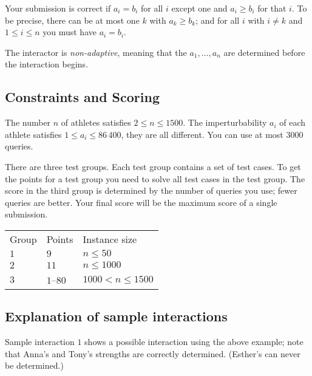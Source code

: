Your submission is correct if $a_i=b_i$ for all $i$ except one and $a_i \ge b_i$ for that $i$.
To be precise, there can be at most one $k$ with $a_k\geq b_k$;
and for all $i$ with $i\neq k$ and $1\leq i\leq n$ you must have $a_i=b_i$.

The interactor is \emph{non-adaptive}, meaning that the $a_1,\ldots, a_n$ are determined before the interaction begins.

\subsection*{Constraints and Scoring}

The number $n$ of athletes satisfies 
$2\leq n\leq 1500$. %
The imperturbability $a_i$ of each athlete satisfies 
$1\leq a_i\leq 86\,400$, %
they are all different. %
You can use 
at most $3000$ queries. %

There are three test groups.
Each test group contains a set of test cases. 
To get the points for a test group you need to solve all test cases in the test group.
The score in the third group is determined by the number of queries you use;
fewer queries are better.
Your final score will be the maximum score of a single submission.

\medskip
\begin{tabular}{lll}
Group & Points & Instance size\\
$1$  &  $9$ & $n\leq 50$\\
$2$  &  $11$ & $n\leq 1000$\\
$3$  &  $1$--$80$ & $1000 < n\leq 1500$\\
\end{tabular}

\subsection*{Explanation of sample interactions}


Sample interaction $1$ shows a possible interaction using the above example; note that Anna's and Tony's strengths are correctly determined.
(Esther's can never be determined.)
